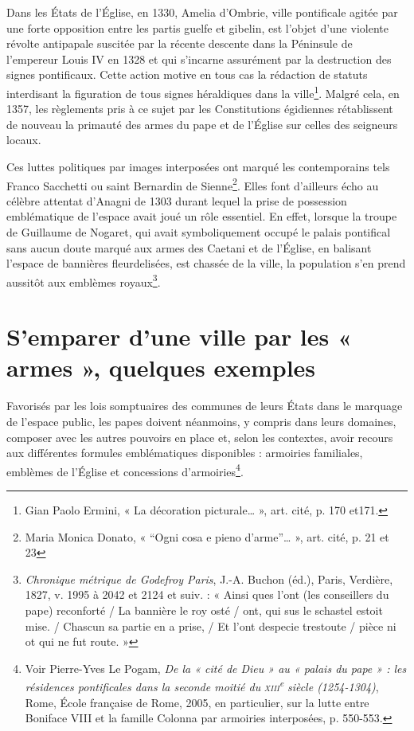 \documentclass[12pt,twoside,openany]{book}
\begin{document}
Dans les États de l’Église, en 1330, Amelia d’Ombrie, ville pontificale agitée par une forte opposition entre les partis guelfe et gibelin, est l’objet d’une violente révolte antipapale suscitée par la récente descente dans la Péninsule de l’empereur Louis IV en 1328 et qui s’incarne assurément par la destruction des signes pontificaux. Cette action motive en tous cas la rédaction de statuts interdisant la figuration de tous signes héraldiques dans la ville\footnote{Gian Paolo Ermini, « La décoration picturale… », art. cité, p. 170 et171.}. Malgré cela, en 1357, les règlements pris à ce sujet par les Constitutions égidiennes rétablissent de nouveau la primauté des armes du pape et de l’Église sur celles des seigneurs locaux.

Ces luttes politiques par images interposées ont marqué les contemporains tels Franco Sacchetti ou saint Bernardin de Sienne\footnote{Maria Monica Donato, « “Ogni cosa e pieno d’arme”… », art. cité, p. 21 et 23}. Elles font d’ailleurs écho au célèbre attentat d’Anagni de 1303 durant lequel la prise de possession emblématique de l’espace avait joué un rôle essentiel. En effet, lorsque la troupe de Guillaume de Nogaret, qui avait symboliquement occupé le palais pontifical sans aucun doute marqué aux armes des Caetani et de l’Église, en balisant l’espace de bannières fleurdelisées, est chassée de la ville, la population s’en prend aussitôt aux emblèmes royaux\footnote{\textit{Chronique métrique de Godefroy Paris}, J.-A. Buchon (éd.), Paris, Verdière, 1827, v. 1995 à 2042 et 2124 et suiv. : « Ainsi ques l’ont (les conseillers du pape) reconforté / La bannière le roy osté / ont, qui sus le schastel estoit mise. / Chascun sa partie en a prise, / Et l’ont despecie trestoute / pièce ni ot qui ne fut route. »}.

\section{S’emparer d’une ville par les « armes », quelques exemples}

Favorisés par les lois somptuaires des communes de leurs États dans le marquage de l’espace public, les papes doivent néanmoins, y compris dans leurs domaines, composer avec les autres pouvoirs en place et, selon les contextes, avoir recours aux différentes formules emblématiques disponibles : armoiries familiales, emblèmes de l’Église et concessions d’armoiries\footnote{Voir Pierre-Yves Le Pogam, \textit{De la « cité de Dieu » au « palais du pape » : les résidences pontificales dans la seconde moitié du }\textit{\textsc{xiii}}\textit{\textsuperscript{e}}\textit{ siècle (1254-1304)}, Rome, École française de Rome, 2005, en particulier, sur la lutte entre Boniface VIII et la famille Colonna par armoiries interposées, p. 550-553.}.
\end{document}
